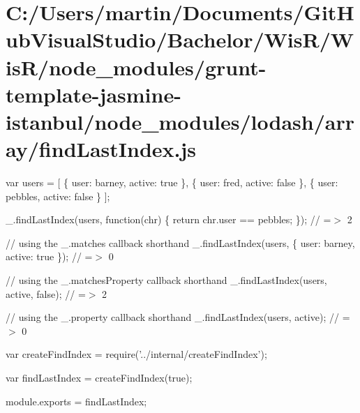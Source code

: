 \hypertarget{_c_1_2_users_2martin_2_documents_2_git_hub_visual_studio_2_bachelor_2_wis_r_2_wis_r_2node_module6479051ee1bf5b1df998a35f2a1d7d09}{}\section{C\+:/\+Users/martin/\+Documents/\+Git\+Hub\+Visual\+Studio/\+Bachelor/\+Wis\+R/\+Wis\+R/node\+\_\+modules/grunt-\/template-\/jasmine-\/istanbul/node\+\_\+modules/lodash/array/find\+Last\+Index.\+js}
var users = \mbox{[} \{ \textquotesingle{}user\textquotesingle{}\+: \textquotesingle{}barney\textquotesingle{}, \textquotesingle{}active\textquotesingle{}\+: true \}, \{ \textquotesingle{}user\textquotesingle{}\+: \textquotesingle{}fred\textquotesingle{}, \textquotesingle{}active\textquotesingle{}\+: false \}, \{ \textquotesingle{}user\textquotesingle{}\+: \textquotesingle{}pebbles\textquotesingle{}, \textquotesingle{}active\textquotesingle{}\+: false \} \mbox{]};

\+\_\+.\+find\+Last\+Index(users, function(chr) \{ return chr.\+user == \textquotesingle{}pebbles\textquotesingle{}; \}); // =$>$ 2

// using the {\ttfamily \+\_\+.\+matches} callback shorthand \+\_\+.\+find\+Last\+Index(users, \{ \textquotesingle{}user\textquotesingle{}\+: \textquotesingle{}barney\textquotesingle{}, \textquotesingle{}active\textquotesingle{}\+: true \}); // =$>$ 0

// using the {\ttfamily \+\_\+.\+matches\+Property} callback shorthand \+\_\+.\+find\+Last\+Index(users, \textquotesingle{}active\textquotesingle{}, false); // =$>$ 2

// using the {\ttfamily \+\_\+.\+property} callback shorthand \+\_\+.\+find\+Last\+Index(users, \textquotesingle{}active\textquotesingle{}); // =$>$ 0


\begin{DoxyCodeInclude}
var createFindIndex = require(\textcolor{stringliteral}{'../internal/createFindIndex'});

var findLastIndex = createFindIndex(\textcolor{keyword}{true});

module.exports = findLastIndex;
\end{DoxyCodeInclude}
 